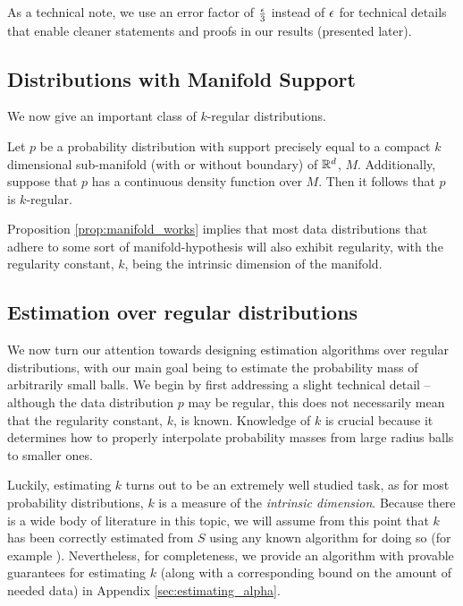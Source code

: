 As a technical note, we use an error factor of $\frac{\epsilon}{3}$ instead of $\epsilon$ for technical details that enable cleaner statements and proofs in our results (presented later). 

\subsection{Distributions with Manifold Support}

We now give an important class of $k$-regular distributions.

\begin{proposition}\label{prop:manifold_works}
Let $p$ be a probability distribution with support precisely equal to a compact $k$ dimensional sub-manifold (with or without boundary) of $\mathbb{R}^d$, $M$. Additionally, suppose that $p$ has a continuous density function over $M$. Then it follows that $p$ is $k$-regular.
\end{proposition}

Proposition \ref{prop:manifold_works} implies that most data distributions that adhere to some sort of manifold-hypothesis will also exhibit regularity, with the regularity constant, $k$, being the intrinsic dimension of the manifold.

\subsection{Estimation over regular distributions}

We now turn our attention towards designing estimation algorithms over regular distributions, with our main goal being to estimate the probability mass of arbitrarily small balls. We begin by first addressing a slight technical detail -- although the data distribution $p$ may be regular, this does not necessarily mean that the regularity constant, $k$, is known. Knowledge of $k$ is crucial because it determines how to properly interpolate probability masses from large radius balls to smaller ones. 

Luckily, estimating $k$ turns out to be an extremely well studied task, as for most probability distributions, $k$ is a measure of the \textit{intrinsic dimension}. Because there is a wide body of literature in this topic, we will assume from this point that $k$ has been correctly estimated from $S$ using any known algorithm for doing so (for example \cite{BJPR22}). Nevertheless, for completeness, we provide an algorithm with provable guarantees for estimating $k$ (along with a corresponding bound on the amount of needed data) in Appendix \ref{sec:estimating_alpha}.

